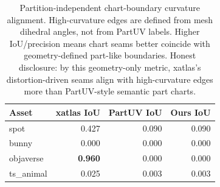 \begin{table}[t]
\centering
\scriptsize
\caption{Partition-independent chart-boundary curvature alignment. High-curvature edges are defined from mesh dihedral angles, not from PartUV labels. Higher IoU/precision means chart seams better coincide with geometry-defined part-like boundaries. Honest disclosure: by this geometry-only metric, xatlas's distortion-driven seams align with high-curvature edges more than PartUV-style semantic part charts.}
\label{tab:curvature_alignment}
\begin{tabular}{@{}lrrr@{}}
\toprule
Asset & xatlas IoU & PartUV IoU & Ours IoU \\
\midrule
spot & 0.427 & 0.090 & 0.090 \\
bunny & 0.000 & 0.000 & 0.000 \\
objaverse & \textbf{0.960} & 0.000 & 0.000 \\
ts\_animal & 0.025 & 0.003 & 0.003 \\
\bottomrule
\end{tabular}
\end{table}
